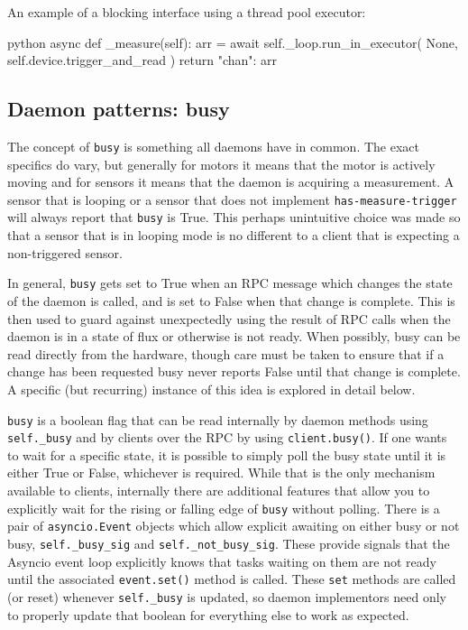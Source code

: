An example of a blocking interface using a thread pool executor:

\begin{codefragment}{python}
    async def _measure(self):
        arr = await self._loop.run_in_executor(
            None,
            self.device.trigger_and_read
        )
        return {"chan": arr}
\end{codefragment}

\subsection{Daemon patterns: busy}

The concept of \texttt{busy} is something all \yaq{} daemons have in common.
The exact specifics do vary, but generally for motors it means that the motor is actively moving and for sensors it means that the daemon is acquiring a measurement.
A sensor that is looping or a sensor that does not implement \texttt{has-measure-trigger} will always report that \texttt{busy} is True.
This perhaps unintuitive choice was made so that a sensor that is in looping mode is no different to a client that is expecting a non-triggered sensor.

In general, \texttt{busy} gets set to True when an RPC message which changes the state of the daemon is called, and is set to False when that change is complete.
This is then used to guard against unexpectedly using the result of RPC calls when the daemon is in a state of flux or otherwise is not ready.
When possibly, busy can be read directly from the hardware, though care must be taken to ensure that if a change has been requested busy never reports False until that change is complete.
A specific (but recurring) instance of this idea is explored in detail below.

\texttt{busy} is a boolean flag that can be read internally by daemon methods using \texttt{self.\_busy} and by clients over the RPC by using \texttt{client.busy()}.
If one wants to wait for a specific state, it is possible to simply poll the busy state until it is either True or False, whichever is required.
While that is the only mechanism available to clients, internally there are additional features that allow you to explicitly wait for the rising or falling edge of \texttt{busy} without polling.
There is a pair of \texttt{asyncio.Event} objects\cite{} which allow explicit awaiting on either busy or not busy, \texttt{self.\_busy\_sig} and \texttt{self.\_not\_busy\_sig}.
These provide signals that the Asyncio event loop explicitly knows that tasks waiting on them are not ready until the associated \texttt{event.set()} method is called.
These \texttt{set} methods are called (or reset) whenever \texttt{self.\_busy} is updated, so daemon implementors need only to properly update that boolean for everything else to work as expected.

